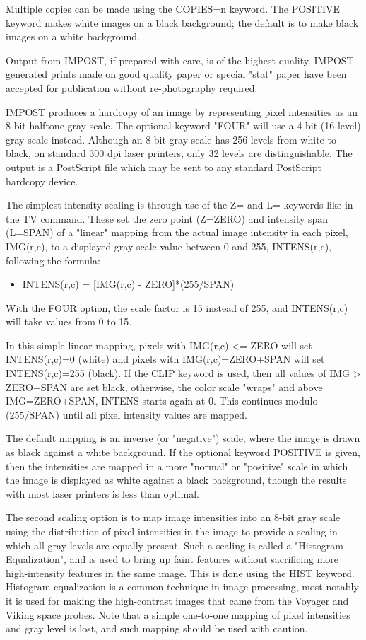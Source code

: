 Multiple copies can be made using the COPIES=n keyword.  The POSITIVE
keyword makes white images on a black background; the default is to make
black images on a white background.

Output from IMPOST, if prepared with care, is of the highest quality.
IMPOST generated prints made on good quality paper or special "stat" paper
have been accepted for publication without re-photography required.


IMPOST produces a hardcopy of an image by representing pixel intensities as
an 8-bit halftone gray scale.  The optional keyword "FOUR" will use a 4-bit
(16-level) gray scale instead.  Although an 8-bit gray scale has 256 levels
from white to black, on standard 300 dpi laser printers, only 32 levels are
distinguishable.  The output is a PostScript file which may be sent to any
standard PostScript hardcopy device.


The simplest intensity scaling is through use of the Z= and L= keywords
like in the TV command.  These set the zero point (Z=ZERO) and intensity
span (L=SPAN) of a "linear" mapping from the actual image intensity in each
pixel, IMG(r,c), to a displayed gray scale value between 0 and 255,
INTENS(r,c), following the formula:
\begin{itemize}
  \item{          INTENS(r,c) = {[IMG(r,c) - ZERO]}*(255/SPAN)}
\end{itemize}
With the FOUR option, the scale factor is 15 instead of 255, and
INTENS(r,c) will take values from 0 to 15.

In this simple linear mapping, pixels with IMG(r,c) <= ZERO will set
INTENS(r,c)=0 (white) and pixels with IMG(r,c)=ZERO+SPAN will set
INTENS(r,c)=255 (black).  If the CLIP keyword is used, then all values of
IMG > ZERO+SPAN are set black, otherwise, the color scale "wraps" and above
IMG=ZERO+SPAN, INTENS starts again at 0.  This continues modulo (255/SPAN)
until all pixel intensity values are mapped.

The default mapping is an inverse (or "negative") scale, where the image is
drawn as black against a white background.  If the optional keyword
POSITIVE is given, then the intensities are mapped in a more "normal" or
"positive" scale in which the image is displayed as white against a black
background, though the results with most laser printers is less than
optimal.

The second scaling option is to map image intensities into an 8-bit gray
scale using the distribution of pixel intensities in the image to provide a
scaling in which all gray levels are equally present.  Such a scaling is
called a "Histogram Equalization", and is used to bring up faint features
without sacrificing more high-intensity features in the same image.  This
is done using the HIST keyword.  Histogram equalization is a common
technique in image processing, most notably it is used for making the
high-contrast images that came from the Voyager and Viking space probes.
Note that a simple one-to-one mapping of pixel intensities and gray level
is lost, and such mapping should be used with caution.

